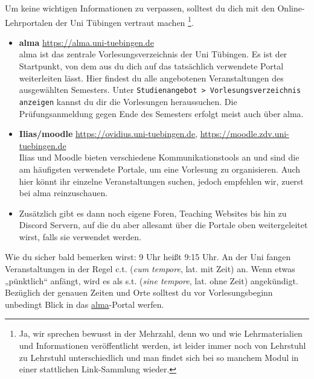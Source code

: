 Um keine wichtigen Informationen zu verpassen, solltest du dich mit den Online-Lehrportalen der Uni Tübingen vertraut machen
\footnote{Ja, wir sprechen bewusst in der Mehrzahl, denn wo und wie Lehrmaterialien und Informationen veröffentlicht werden, ist leider immer noch
von Lehrstuhl zu Lehrstuhl unterschiedlich und man findet sich bei so manchem Modul in einer stattlichen Link-Sammlung wieder.}.
\begin{itemize}
	\item \textbf{\hypertarget{alma}{alma}} \url{https://alma.uni-tuebingen.de} \\
	alma ist das zentrale Vorlesungsverzeichnis der Uni Tübingen. Es ist der Startpunkt, von dem aus du dich auf das tatsächlich verwendete Portal weiterleiten lässt.
	Hier findest du alle angebotenen Veranstaltungen des ausgewählten Semesters. Unter \texttt{Studienangebot > Vorlesungsverzeichnis anzeigen} kannst du dir die Vorlesungen heraussuchen. Die Prüfungsanmeldung gegen Ende des Semesters erfolgt meist auch über alma.
	\item \textbf{Ilias/moodle} \url{https://ovidius.uni-tuebingen.de}, \url{https://moodle.zdv.uni-tuebingen.de} \\
	Ilias und Moodle bieten verschiedene Kommunikationstools an und sind die am häufigsten verwendete Portale, um eine Vorlesung zu organisieren.
	Auch hier könnt ihr einzelne Veranstaltungen suchen, jedoch empfehlen wir, zuerst bei alma reinzuschauen.
	\item Zusätzlich gibt es dann noch eigene Foren, Teaching Websites bis hin zu Discord Servern, auf die du aber allesamt über die Portale oben
	weitergeleitet wirst, falls sie verwendet werden.
\end{itemize}


Wie du sicher bald bemerken wirst: 9 Uhr heißt 9:15 Uhr. An der Uni fangen Veranstaltungen in der Regel c.t. (\textit{cum
tempore}, lat. \glqq mit Zeit\grqq) an. Wenn etwas „pünktlich“ anfängt, wird es als s.t. (\textit{sine tempore}, lat. \glqq ohne
Zeit\grqq) angekündigt.
Bezüglich der genauen Zeiten und Orte solltest du vor Vorlesungsbeginn unbedingt Blick in das \hyperlink{alma}{alma}-Portal werfen.

\ifmaster \pagebreak \fi

